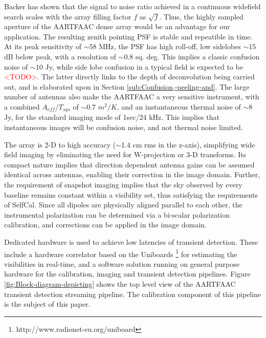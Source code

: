 \documentclass{aa}
\begin{document}
Backer \citep{backer1999pers} has shown that  the signal to noise ratio achieved
in a  continuous widefield search  scales with the  array filling factor  $f$ as
$\sqrt{f}$. Thus, the highly sampled  aperture of the AARTFAAC dense array would
be an advantage for our application. The resulting zenith pointing PSF is stable
and repeatible in  time. At its peak sensitivity of $\sim$$58$  MHz, the PSF has
high  roll-off, low sidelobes  $\sim$$15$ dB  below peak,  with a  resolution of
$\sim$$0.8$ sq.  deg. This implies a  classic confusion noise  of $\sim$$10$ Jy,
while   side  lobe   confusion   in  a   typical   field  is   expected  to   be
\textcolor{red}{<TODO>}.    The  latter   directly   links  to   the  depth   of
deconvolution   being  carried   out,  and   is  elaborated   upon   in  Section
\ref{sub:Confusion,-peeling-and}.  The  large number  of antennas also  make the
AARTFAAC  a very  sensitive  instrument, with  a  combined $A_{eff}/T_{sys}$  of
$\sim$0.7 $m^{2}/K$\citep{wijnholds2011situ}, and an instantaneous thermal noise
of $\sim$8 Jy, for the standard  imaging mode of 1sec/24 kHz.  This implies that
instantaneous images will be confusion noise, and not thermal noise limited.

The array is 2-D to high  accuracy ($\sim$1.4 cm rms in the z-axis), simplifying
wide field imaging  by eliminating the need for  W-projection or 3-D transforms.
Its compact nature implies that direction dependent antenna gains can be assumed
identical  across  antennas, enabling  their  correction  in  the image  domain.
Further, the  requirement of snapshot imaging  implies that the  sky observed by
every baseline  remains constant  within a visibility  set, thus  satisfying the
requirements of  SelfCal. Since all  dipoles are physically aligned  parallel to
each  other, the  instrumental polarization  can be  determined via  a bi-scalar
polarization calibration, and corrections can be applied in the image domain.

Dedicated  hardware is  used to  achieve low  latencies of  transient detection.
These      include     a      hardware     correlator      based      on     the
Uniboards  \footnote{http://www.radionet-eu.org/uniboard}   for  estimating  the
visibilities in  real-time, and a  software solution running on  general purpose
hardware for the calibration, imaging and transient detection pipelines.  Figure
\ref{fig:Block-diagram-depicting}  shows  the top  level  view  of the  AARTFAAC
transient  detection  streaming pipeline.   The  calibration  component of  this
pipeline is the subject of this paper.
\end{document}
